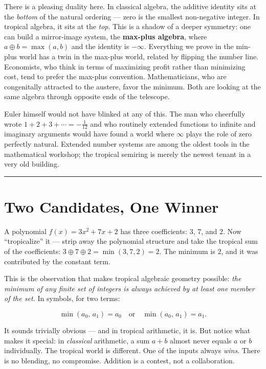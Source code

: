 There is a pleasing duality here. In classical algebra, the additive identity sits at the \emph{bottom} of the natural ordering --- zero is the smallest non-negative integer. In tropical algebra, it sits at the \emph{top}. This is a shadow of a deeper symmetry: one can build a mirror-image system, the \textbf{max-plus algebra}, where \(a \oplus b = \max(a,b)\) and the identity is \(-\infty\). Everything we prove in the min-plus world has a twin in the max-plus world, related by flipping the number line. Economists, who think in terms of maximizing profit rather than minimizing cost, tend to prefer the max-plus convention. Mathematicians, who are congenitally attracted to the austere, favor the minimum. Both are looking at the same algebra through opposite ends of the telescope.

Euler himself would not have blinked at any of this. The man who cheerfully wrote \(1 + 2 + 3 + \cdots = -\tfrac{1}{12}\) and who routinely extended functions to infinite and imaginary arguments would have found a world where \(\infty\) plays the role of zero perfectly natural. Extended number systems are among the oldest tools in the mathematical workshop; the tropical semiring is merely the newest tenant in a very old building.

\bigskip\noindent\rule{\linewidth}{0.4pt}\bigskip

\section{Two Candidates, One Winner}
A polynomial \(f(x) = 3x^2 + 7x + 2\) has three coefficients: \(3\), \(7\), and \(2\). Now ``tropicalize'' it --- strip away the polynomial structure and take the tropical sum of the coefficients: \(3 \oplus 7 \oplus 2 = \min(3, 7, 2) = 2\). The minimum is \(2\), and it was contributed by the constant term.

This is the observation that makes tropical algebraic geometry possible: \emph{the minimum of any finite set of integers is always achieved by at least one member of the set.} In symbols, for two terms:

\[\min(a_0,\, a_1) = a_0 \quad \text{or} \quad \min(a_0,\, a_1) = a_1.\]

It sounds trivially obvious --- and in tropical arithmetic, it is. But notice what makes it special: in \emph{classical} arithmetic, a sum \(a + b\) almost never equals \(a\) or \(b\) individually. The tropical world is different. One of the inputs always \emph{wins}. There is no blending, no compromise. Addition is a contest, not a collaboration.


